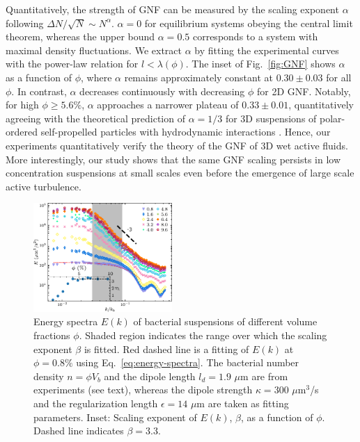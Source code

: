 \documentclass[twocolumn,aps,prx,amsmath,amssymb,longbibliography]{revtex4-2}
\begin{document}
Quantitatively, the strength of GNF can be measured by the scaling exponent $\alpha$ following $\Delta N/\sqrt{N} \sim N^\alpha$. $\alpha=0$ for equilibrium systems obeying the central limit theorem, whereas the upper bound $\alpha = 0.5$ corresponds to a system with maximal density fluctuations.
We extract $\alpha$ by fitting the experimental curves with the power-law relation for $l < \lambda(\phi)$. The inset of Fig.~\ref{fig:GNF} shows $\alpha$ as a function of $\phi$, where $\alpha$ remains approximately constant at $0.30 \pm 0.03$ for all $\phi$. In contrast, $\alpha$ decreases continuously with decreasing $\phi$ for 2D GNF. Notably, for high $\phi \geq 5.6\%$, $\alpha$ approaches a narrower plateau of $0.33 \pm 0.01$, quantitatively agreeing with the theoretical prediction of $\alpha = 1/3$ for 3D suspensions of polar-ordered self-propelled particles with hydrodynamic interactions \cite{AditiSimha2002}. Hence, our experiments quantitatively verify the theory of the GNF of 3D wet active fluids. More interestingly, our study shows that the same GNF scaling persists in low concentration suspensions at small scales even before the emergence of large scale active turbulence.

\begin{figure}[t]
\begin{center}\includegraphics[width=0.47\textwidth]{Figures/energy-spectra/v6.pdf}
\caption[Concentration dependence of energy spectra.]
{
Energy spectra $E(k)$ of bacterial suspensions of different volume fractions $\phi$. Shaded region indicates the range over which the scaling exponent $\beta$ is fitted. Red dashed line is a fitting of $E(k)$ at $\phi=0.8\%$ using Eq.~\ref{eq:energy-spectra}. The bacterial number density $n=\phi V_b$ and the dipole length $l_d = 1.9$ $\mu$m are from experiments (see text), whereas the dipole strength $\kappa = 300$ $\mu$m$^3$/s and the regularization length $\epsilon = 14$ $\mu$m are taken as fitting parameters.
Inset: Scaling exponent of $E(k)$, $\beta$, as a function of $\phi$. Dashed line indicates $\beta = 3.3$.
}
\label{fig:energy-spectra}
\end{center}
\end{figure}
\end{document}
